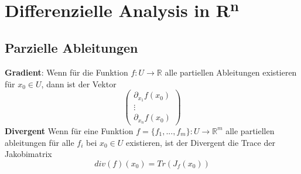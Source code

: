 \section{Differenzielle Analysis in R\textsuperscript{n}}
\subsection{Parzielle Ableitungen}
  \textbf{Gradient}: Wenn für die Funktion $f:U\rightarrow \mathbb R$ alle partiellen Ableitungen existieren für $x_0\in U$, dann ist der Vektor $$\begin{pmatrix}\partial_{x_1}f(x_0)\\\vdots\\\partial_{x_n}f(x_0)\end{pmatrix}$$
    \textbf{Divergent} Wenn für eine Funktion $f=\{f_1,...,f_m\}:U\rightarrow\mathbb R^m$ alle partiellen ableitungen für alle $f_i$ bei $x_0\in U$ existieren, ist der Divergent die Trace der Jakobimatrix $$div(f)(x_0)=Tr(J_f(x_0))$$
